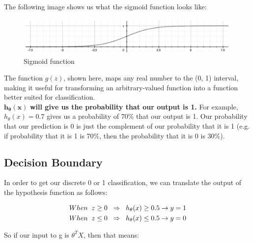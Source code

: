 \pagebreak

The following image shows us what the sigmoid function looks like:

\begin{figure}[h!]
	\centering
	\includegraphics[width=1\textwidth]{fig/sigmoide}
	\caption{Sigmoid function}
\end{figure}

The function $ g(z) $, shown here, maps any real number to the (0, 1) interval, making it useful for transforming an arbitrary-valued function into a function better suited for classification.\\

$\mathbf{ h_\theta(x)  }$ \textbf{will give us the probability that our output is 1.} For example, $ h_\theta(x)=0.7 $ gives us a probability of 70\% that our output is 1. Our probability that our prediction is 0 is just the complement of our probability that it is 1 (e.g. if probability that it is 1 is 70\%, then the probability that it is 0 is 30\%).

\subsection{Decision Boundary}

In order to get our discrete 0 or 1 classification, we can translate the output of the hypothesis function as follows:

\begin{tcolorbox}[width=\textwidth,colback={white},colbacktitle=white]
	\begin{align*}
	When \hspace{0.2cm} z \geq 0  \hspace{0.2cm} \Rightarrow \hspace{0.2cm} h_\theta(x) & \geq 0.5 \rightarrow y=1\\
	When \hspace{0.2cm} z \leq 0  \hspace{0.2cm} \Rightarrow \hspace{0.2cm} h_\theta(x) & \leq 0.5 \rightarrow y=0
	\end{align*}
\end{tcolorbox} 

So if our input to g is $ \theta^T X $, then that means:

